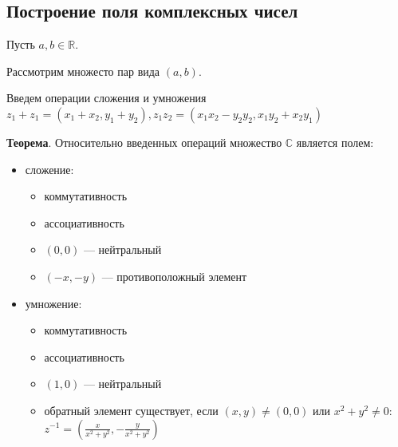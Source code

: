 \documentclass[a4paper]{article}
\begin{document}
    \newpage \begin{center}
                 \begin{Large}
                 \end{Large}
    \end{center}
    \subsection*{Построение поля комплексных чисел}
    Пусть $a,b \in \mathbb{R}$.

    Рассмотрим множесто пар вида $(a,b)$.

    Введем операции сложения и умножения $z_1 + z_1 = (x_1+x_2,y_1+y_2), z_1 z_2 = (x_1 x_2 -y_2 y_2, x_1 y_2 + x_2 y_1)$

    \begin{htheorem}
        \textbf{Теорема}. Относительно введенных операций множество $\mathbb{C}$ является полем:
    \end{htheorem}

    \begin{hproof}
        \begin{itemize}
            \item
            сложение:\begin{itemize}
                         \item коммутативность
                         \item ассоциативность
                         \item $(0,0)$ --- нейтральный
                         \item $(-x,-y)$ --- противоположный элемент
            \end{itemize}

            \item
            умножение: \begin{itemize}
                           \item коммутативность
                           \item ассоциативность
                           \item $(1,0)$ --- нейтральный
                           \item обратный элемент существует, если $(x,y) \neq (0,0)$ или $\displaystyle x^2+y^2 \neq 0$: $z^{-1} = \left( \frac{x}{x^2+y^2},-\frac{y}{x^2+y^2} \right)$
            \end{itemize}


        \end{itemize}
    \end{hproof}
\end{document}
